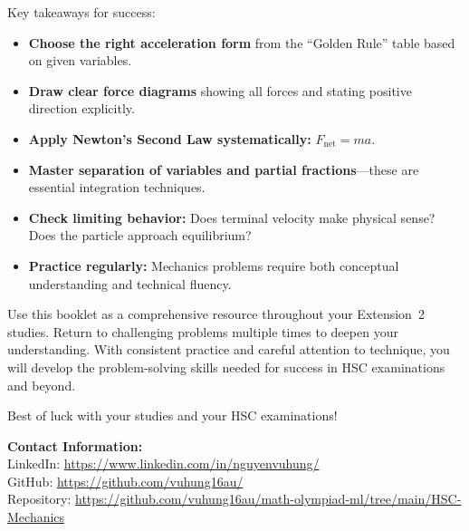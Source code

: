 \documentclass[12pt]{article}
\begin{document}
Key takeaways for success:
\begin{itemize}[leftmargin=*]
  \item \textbf{Choose the right acceleration form} from the ``Golden Rule'' table based on given variables.
  \item \textbf{Draw clear force diagrams} showing all forces and stating positive direction explicitly.
  \item \textbf{Apply Newton's Second Law systematically:} $F_{\text{net}} = ma$.
  \item \textbf{Master separation of variables and partial fractions}---these are essential integration techniques.
  \item \textbf{Check limiting behavior:} Does terminal velocity make physical sense? Does the particle approach equilibrium?
  \item \textbf{Practice regularly:} Mechanics problems require both conceptual understanding and technical fluency.
\end{itemize}

Use this booklet as a comprehensive resource throughout your Extension~2 studies. Return to challenging problems multiple times to deepen your understanding. With consistent practice and careful attention to technique, you will develop the problem-solving skills needed for success in HSC examinations and beyond.

Best of luck with your studies and your HSC examinations!

\vspace{2em}
\noindent\textbf{Contact Information:}\\[0.5em]
LinkedIn: \href{https://www.linkedin.com/in/nguyenvuhung/}{https://www.linkedin.com/in/nguyenvuhung/}\\[0.3em]
GitHub: \href{https://github.com/vuhung16au/}{https://github.com/vuhung16au/}\\[0.3em]
Repository: \href{https://github.com/vuhung16au/math-olympiad-ml/tree/main/HSC-Mechanics}{https://github.com/vuhung16au/math-olympiad-ml/tree/main/HSC-Mechanics}
\end{document}
